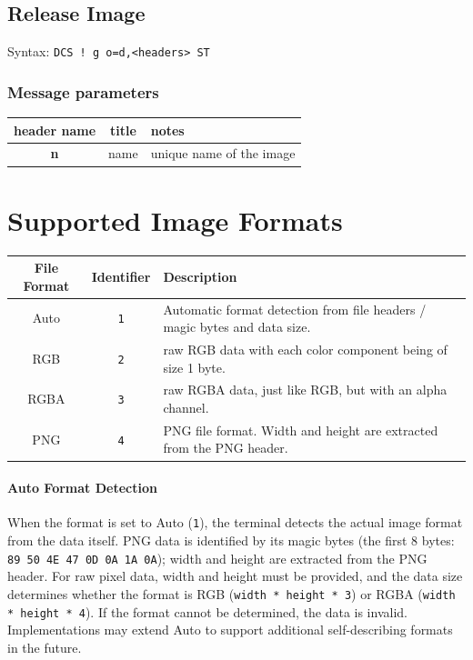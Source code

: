 \documentclass[a4paper]{article}
\newcommand{\code}[1]{\colorbox{light-gray}{\texttt{#1}}}
\begin{document}
\subsection{Release Image} %

Syntax: \code{DCS ! g o=d,<headers> ST}

\subsubsection*{Message parameters}

\begin{tabular}{ |c|c|l| }
    \hline
    \textbf{header name}   & \textbf{title}   & \textbf{notes} \\
    \hline
    \textbf{n}             & name             & unique name of the image \\
    \hline
\end{tabular}

\section{Supported Image Formats} %

\label{sec:supported-image-formtats}

\begin{tabular}{c | c | l}
    File Format & Identifier     & Description \\
    \hline
    Auto        & \code{1}       & Automatic format detection from file headers / magic bytes and data size. \\
    RGB         & \code{2}       & raw RGB data with each color component being of size 1 byte. \\
    RGBA        & \code{3}       & raw RGBA data, just like RGB, but with an alpha channel. \\
    PNG         & \code{4}       & PNG file format. Width and height are extracted from the PNG header. \\
    \hline
\end{tabular}

\paragraph*{Auto Format Detection}

When the format is set to Auto (\code{1}), the terminal detects the actual image format
from the data itself.
PNG data is identified by its magic bytes (the first 8 bytes: \code{89 50 4E 47 0D 0A 1A 0A});
width and height are extracted from the PNG header.
For raw pixel data, width and height must be provided, and the data size determines
whether the format is RGB (\code{width * height * 3}) or RGBA (\code{width * height * 4}).
If the format cannot be determined, the data is invalid.
Implementations may extend Auto to support additional self-describing formats in the future.
\end{document}
